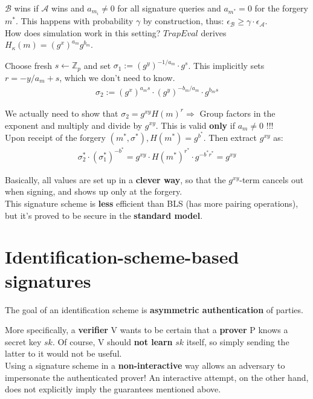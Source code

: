 \documentclass[oneside]{book}
\newcommand{\Z}[0]{\mathbb{Z}}
\newcommand{\cA}[0]{\mathcal{A}}
\newcommand{\cB}[0]{\mathcal{B}}
\newcommand{\epsA}[0]{\epsilon_\cA}
\newcommand{\epsB}[0]{\epsilon_\cB}
\begin{document}
$\cB$ wins if $\cA$ wins and $a_{m_i} \neq 0$ for all signature queries and $a_{m^*} = 0$ for the forgery $m^*$. This happens with probability $\gamma$ by construction, thus: $\epsB \ge \gamma \cdot \epsA$.\\

How does simulation work in this setting? $TrapEval$ derives $H_\kappa(m) = (g^x)^{a_m}g^{b_m}$.

Choose fresh $s \leftarrow \Z_p$ and set $\sigma_1 := (g^y)^{-1/a_m} \cdot g^s$. This implicitly sets $r = -y/a_m + s$, which we don't need to know.
\begin{align}
    \sigma_2 := (g^x)^{a_m s} \cdot (g^y)^{-b_m/a_m} \cdot g^{b_m s}
\end{align}

We actually need to show that $\sigma_2 = g^{xy}H(m)^r \Rightarrow$ Group factors in the exponent and multiply and divide by $g^{xy}$. This is valid \textbf{only} if $a_m \neq 0$ !!!\\

Upon receipt of the forgery $(m^*, \sigma^*), H(m^*) = g^{b^*}$. Then extract $g^{xy}$ as:
\begin{align}
    \sigma_2^* \cdot (\sigma_1^*)^{-b^*} = g^{xy} \cdot H(m^*)^{r^*} \cdot g^{-b^* r^*} = g^{xy}
\end{align}

Basically, all values are set up in a \textbf{clever way}, so that the $g^{xy}$-term cancels out when signing, and shows up only at the forgery.\\

This signature scheme is \textbf{less} efficient than BLS (has more pairing operations), but it's proved to be secure in the \textbf{standard model}.

\chapter{Identification-scheme-based signatures}

The goal of an identification scheme is \textbf{asymmetric authentication} of parties.

More specifically, a \textbf{verifier} V wants to be certain that a \textbf{prover} P knows a secret key $sk$. Of course, V should \textbf{not learn} $sk$ itself, so simply sending the latter to it would not be useful.\\

Using a signature scheme in a \textbf{non-interactive} way allows an adversary to impersonate the authenticated prover! An interactive attempt, on the other hand, does not explicitly imply the guarantees mentioned above.\\
\end{document}
